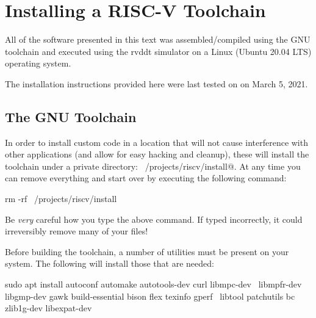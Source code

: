 \chapter{Installing a RISC-V Toolchain}
\label{chapter:install}

All of the software presented in this text was assembled/compiled 
using the GNU toolchain and executed using the rvddt simulator on 
a Linux (Ubuntu 20.04 LTS) operating system.

The installation instructions provided here were last tested on 
on March 5, 2021.

\section{The GNU Toolchain}

%
In order to install custom code in a location that will not cause 
interference with other applications (and allow for easy hacking and
cleanup), these will install the toolchain under
a private directory: \verb@~/projects/riscv/install@.  At any time
you can remove everything and start over by executing the following 
command:

\begin{tty}
rm -rf ~/projects/riscv/install
\end{tty}

\begin{tcolorbox}
Be {\em very} careful how you type the above \verb@rm@ command.  
If typed incorrectly, it could irreversibly remove many of your files!
\end{tcolorbox}

Before building the toolchain, a number of utilities must be present on 
your system.  The following will install those that are needed:

\begin{minipage}{\textwidth}
\begin{tty}
sudo apt install autoconf automake autotools-dev curl libmpc-dev \
    libmpfr-dev libgmp-dev gawk build-essential bison flex texinfo gperf \
    libtool patchutils bc zlib1g-dev libexpat-dev
\end{tty}
\end{minipage}

